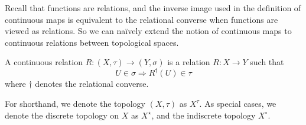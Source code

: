 

Recall that functions are relations, and the inverse image used in the definition of continuous maps is equivalent to the relational converse when functions are viewed as relations. So we can na\"{i}vely extend the notion of continuous maps to continuous relations between topological spaces.

\begin{defn}\label{defn:toprelation}
A continuous relation $R: (X,\tau) \rightarrow (Y,\sigma)$ is a relation $R: X \rightarrow Y$ such that \[U \in \sigma \Rightarrow R^{\dag}(U) \in \tau\] where $\dag$ denotes the relational converse.
\end{defn}

\begin{notation}
For shorthand, we denote the topology $(X,\tau)$ as $X^{\tau}$. As special cases, we denote the discrete topology on $X$ as $X^{\star}$, and the indiscrete topology $X^{\circ}$.
\end{notation}

